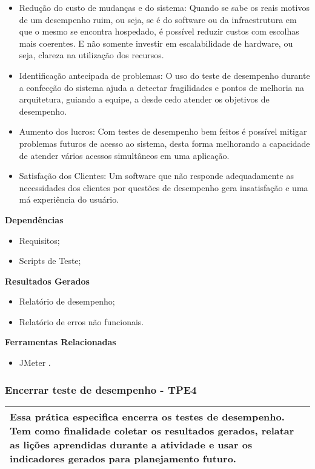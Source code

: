 \begin{itemize}
	\item Redução do custo de mudanças e do sistema: Quando se sabe os reais motivos de um desempenho ruim, ou seja, se é do software ou da infraestrutura em que o mesmo se encontra hospedado, é possível reduzir custos com escolhas mais coerentes. E não somente investir em escalabilidade de hardware, ou seja, clareza na utilização dos recursos.
	\item Identificação antecipada de problemas: O uso do teste de desempenho durante a confecção do sistema ajuda a detectar fragilidades e pontos de melhoria na arquitetura, guiando a equipe, a desde cedo atender os objetivos de desempenho.
	\item Aumento dos lucros: Com testes de desempenho bem feitos é possível mitigar problemas futuros de acesso ao sistema, desta forma melhorando a capacidade de atender vários acessos simultâneos em uma aplicação.
	\item Satisfação dos Clientes: Um software que não responde adequadamente as necessidades dos clientes por questões de desempenho gera insatisfação e uma má experiência do usuário.
\end{itemize}

\textbf{Dependências}
\begin{itemize}
    \item Requisitos;
    \item Scripts de Teste;
\end{itemize}

\textbf{Resultados Gerados}
\begin{itemize}
    \item Relatório de desempenho;
    \item Relatório de erros não funcionais.
\end{itemize}

\textbf{Ferramentas Relacionadas}
\begin{itemize}
    \item JMeter \cite{JMeter}.
\end{itemize}

\subsubsection{Encerrar teste de desempenho - TPE4}
\label{sec:tpe1}

\begin{table}[H]
\centering
\begin{tabular}{|p{130mm}|}
\hline
Essa prática especifica encerra os testes de desempenho. Tem como finalidade coletar os resultados gerados, relatar as lições aprendidas durante a atividade e usar os indicadores gerados para planejamento futuro.\\ 
\hline
\end{tabular}
\end{table}

